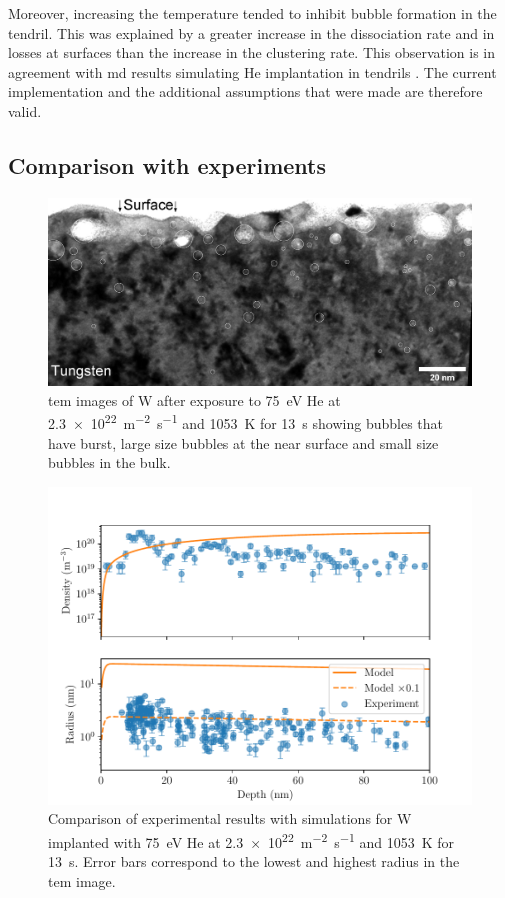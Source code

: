 Moreover, increasing the temperature tended to inhibit bubble formation in the \gls{tendril}.
This was explained by a greater increase in the dissociation rate and in losses at surfaces than the increase in the clustering rate.
This observation is in agreement with \gls{md} results simulating He implantation in \glspl{tendril} .
The current implementation and the additional assumptions that were made are therefore valid.

\subsection{Comparison with experiments}

\begin{figure} [h]
    \centering
    \includegraphics[width=\linewidth]{Figures/Chapter4/bubbles_tem.jpg}
    \caption{\gls{tem} images of W after exposure to \SI{75}{eV} He at \SI{2.3e22}{m^{-2}.s^{-1}} and \SI{1053}{K} for \SI{13}{s} showing bubbles that have burst, large size bubbles at the near surface and small size bubbles in the bulk.}
\end{figure}

\begin{figure} [h!]
    \centering
    \includegraphics[width=\linewidth]{Figures/Chapter4/comparison_model_exp.pdf}
    \caption{Comparison of experimental results with simulations for W implanted with \SI{75}{eV} He at \SI{2.3e22}{m^{-2}.s^{-1}} and \SI{1053}{K} for \SI{13}{s}. Error bars correspond to the lowest and highest radius in the \gls{tem} image.}
\end{figure}

